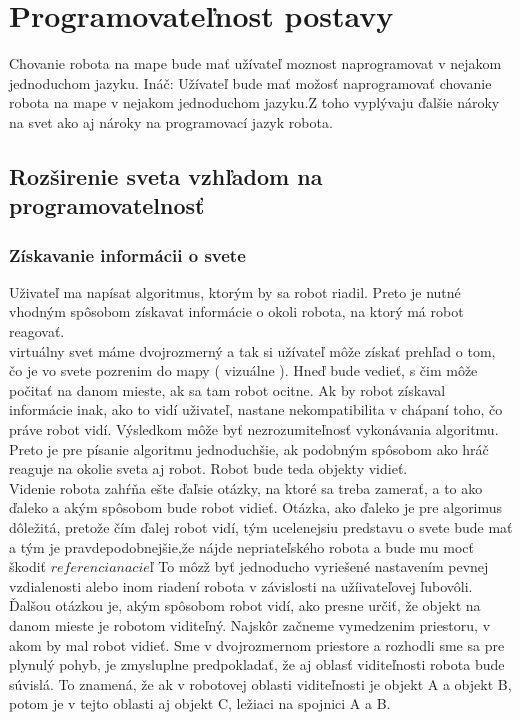 \section{Programovateľnost postavy}
Chovanie robota na  mape bude mať užívateľ moznost naprogramovat v nejakom jednoduchom jazyku. Ináč: Užívateľ bude mať možosť naprogramovať chovanie robota na mape v nejakom jednoduchom jazyku.Z toho vyplývaju ďalšie nároky na svet ako aj nároky na programovací jazyk robota. 
\subsection{Rozširenie sveta vzhľadom na programovatelnosť}
\subsubsection{Získavanie informácii o svete}
Uživateľ ma napísat algoritmus, ktorým by sa robot riadil. Preto je nutné vhodným spôsobom získavat informácie o  okoli robota, na ktorý má robot reagovať. \\
virtuálny svet máme dvojrozmerný a tak si užívateľ môže získať prehľad o tom, čo je vo svete pozrenim do mapy ( vizuálne ). Hneď bude vedieť, s čim môže počitať na danom mieste, ak sa tam robot ocitne. Ak by robot získaval informácie inak, ako to vidí uživateľ, nastane nekompatibilita v chápaní toho, čo práve robot vidí. Výsledkom môže byť nezrozumiteľnosť vykonávania algoritmu. %
Preto je pre písanie algoritmu jednoduchšie, ak podobným spôsobom ako hráč reaguje na okolie sveta aj robot. Robot bude teda objekty vidieť.\\
Videnie robota zahŕňa ešte ďaľsie otázky, na ktoré sa treba zamerať, a to ako ďaleko a akým spôsobom bude robot vidieť. Otázka, ako ďaleko je pre algorimus dôležitá, pretože čím ďalej robot vidí, tým ucelenejsiu predstavu o svete bude mať a tým je pravdepodobnejšie,že nájde nepriateľského robota a bude mu mocť škodiť $referencia na cieľ$ To môzž byť jednoducho vyriešené nastavením pevnej vzdialenosti alebo inom riadení robota v závislosti na užíivateľovej ľubovôli. \\ %
Ďalšou otázkou je, akým spôsobom robot vidí, ako presne určiť, že objekt na danom mieste je robotom viditeľný. Najskôr začneme vymedzenim priestoru, v akom by mal robot vidieť. Sme v dvojrozmernom priestore a rozhodli sme sa pre plynulý pohyb, je zmysluplne predpokladať, že aj oblasť viditeľnosti robota bude súvislá. To znamená, že ak v robotovej oblasti viditeľnosti je objekt A a objekt B, potom je v tejto oblasti aj objekt C, ležiaci na spojnici  A a B.
